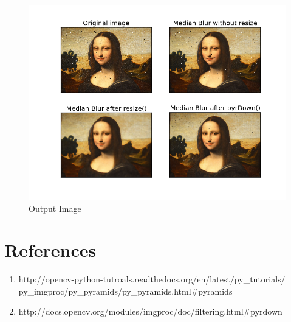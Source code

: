 \documentclass[]{article}
\providecommand{\tightlist}{%
  \setlength{\itemsep}{0pt}\setlength{\parskip}{0pt}}
\begin{document}
\begin{figure}[htbp]
\centering
\includegraphics{compare.png}
\caption{Output Image}
\end{figure}

\section{References}\label{references}

\begin{enumerate}
\def\labelenumi{\arabic{enumi}.}
\tightlist
\item
  http://opencv-python-tutroals.readthedocs.org/en/latest/py\_tutorials/
  py\_imgproc/py\_pyramids/py\_pyramids.html\#pyramids
\item
  http://docs.opencv.org/modules/imgproc/doc/filtering.html\#pyrdown
\end{enumerate}
\end{document}
